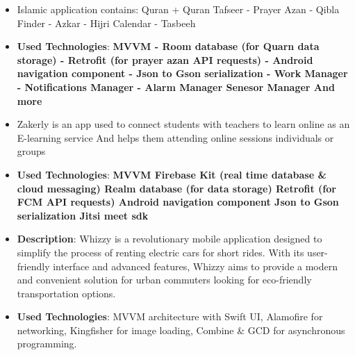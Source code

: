 \documentclass[10pt,a4paper,ragged2e,withhyper]{altacv}
\begin{document}
    \begin{itemize}
        \item \textbf{}Islamic application contains:
        Quran + Quran Tafseer - Prayer Azan - Qibla Finder - Azkar - Hijri Calendar - Tasbeeh
        \item \textbf{Used Technologies}: \textbf{MVVM - Room database (for Quarn data storage) - Retrofit (for prayer azan API requests) - Android navigation component - Json to Gson serialization - Work Manager - Notifications Manager - Alarm Manager Senesor Manager And more}
    \end{itemize}
    \divider



    \begin{itemize}
        \item \textbf{}Zakerly is an app used to connect students with teachers to learn online as an E-learning service And helps them attending online sessions individuals or groups
        \item \textbf{Used Technologies}: \textbf{MVVM Firebase Kit (real time database \& cloud messaging) Realm database (for data storage) Retrofit (for FCM API requests) Android navigation component Json to Gson serialization Jitsi meet sdk}
    \end{itemize}
    \divider


    \vspace{6px}
    \vspace{2px}


    \hypertarget{whizzy}{}
    \begin{itemize}
        \item \textbf{Description}: Whizzy is a revolutionary mobile application designed to simplify the process of renting electric cars for short rides. With its user-friendly interface and advanced features, Whizzy aims to provide a modern and convenient solution for urban commuters looking for eco-friendly transportation options.
        \item \textbf{Used Technologies}: MVVM architecture with Swift UI, Alamofire for networking, Kingfisher for image loading, Combine & GCD for asynchronous programming.
    \end{itemize}
    \divider
\end{document}
